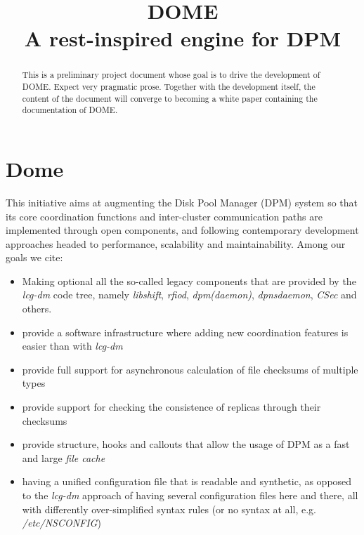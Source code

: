 \documentclass[a4paper,10pt]{scrreprt}
\title{DOME\\A rest-inspired engine for DPM}
\author{}
\begin{document}
\maketitle

\begin{abstract}
This is a preliminary project document whose goal is to drive the development of DOME. Expect very pragmatic prose. Together with
the development itself, the content of the document will converge to becoming a white paper containing the documentation of DOME.
\end{abstract}



\newpage %



\tableofcontents %

\newpage %



\chapter{Dome}

This initiative aims at augmenting the Disk Pool Manager (DPM) system so that its core coordination functions and inter-cluster communication paths are
implemented through open components, and following contemporary development approaches headed to performance, scalability and maintainability. Among our goals we cite:

\begin{itemize}
 \item Making optional all the so-called legacy components that are provided by the \textit{lcg-dm} code tree, namely \textit{libshift}, \textit{rfiod},
 \textit{dpm(daemon)}, \textit{dpnsdaemon}, \textit{CSec} and others.
 \item provide a software infrastructure where adding new coordination features is easier than with \textit{lcg-dm}
 \item provide full support for asynchronous calculation of file checksums of multiple types
 \item provide support for checking the consistence of replicas through their checksums
 \item provide structure, hooks and callouts that allow the usage of DPM as a fast and large \textit{file cache}
 \item having a unified configuration file that is readable and synthetic, as opposed to the \textit{lcg-dm} approach of having several configuration
 files here and there, all with differently over-simplified syntax rules (or no syntax at all, e.g. \textit{/etc/NSCONFIG})
\end{itemize}
\end{document}
